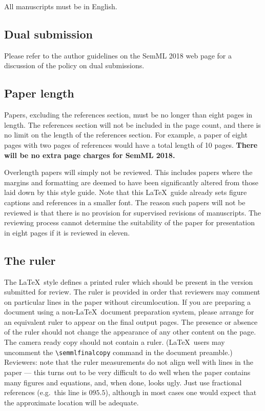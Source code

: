 \documentclass[10pt,twocolumn,letterpaper]{article}
\begin{document}
All manuscripts must be in English.

\subsection{Dual submission}

Please refer to the author guidelines on the SemML 2018 web page for a
discussion of the policy on dual submissions.

\subsection{Paper length}
Papers, excluding the references section,
must be no longer than eight pages in length. The references section
will not be included in the page count, and there is no limit on the
length of the references section. For example, a paper of eight pages
with two pages of references would have a total length of 10 pages.
{\bf There will be no extra page charges for SemML 2018.}

Overlength papers will simply not be reviewed.  This includes papers
where the margins and formatting are deemed to have been significantly
altered from those laid down by this style guide.  Note that this
\LaTeX\ guide already sets figure captions and references in a smaller font.
The reason such papers will not be reviewed is that there is no provision for
supervised revisions of manuscripts.  The reviewing process cannot determine
the suitability of the paper for presentation in eight pages if it is
reviewed in eleven.  

\subsection{The ruler}
The \LaTeX\ style defines a printed ruler which should be present in the
version submitted for review.  The ruler is provided in order that
reviewers may comment on particular lines in the paper without
circumlocution.  If you are preparing a document using a non-\LaTeX\
document preparation system, please arrange for an equivalent ruler to
appear on the final output pages.  The presence or absence of the ruler
should not change the appearance of any other content on the page.  The
camera ready copy should not contain a ruler. (\LaTeX\ users may uncomment
the \verb'\semmlfinalcopy' command in the document preamble.)  Reviewers:
note that the ruler measurements do not align well with lines in the paper
--- this turns out to be very difficult to do well when the paper contains
many figures and equations, and, when done, looks ugly.  Just use fractional
references (e.g.\ this line is $095.5$), although in most cases one would
expect that the approximate location will be adequate.
\end{document}
